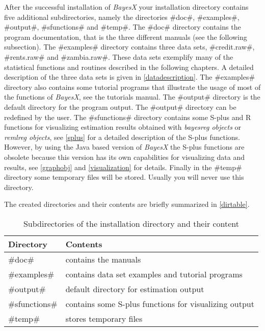 After the successful installation of {\em BayesX} your
installation directory contains five additional subdirectories,
namely the directories #doc#, #examples#, #output#, #sfunctions#
and #temp#. The #doc# directory contains the program
documentation, that is the three different manuals (see the
following subsection). The #examples# directory contains three
data sets, #credit.raw#, #rents.raw# and #zambia.raw#. These data
sets exemplify many of the statistical functions and routines
described in the following chapters. A detailed description of the
three data sets is given in \autoref{datadescription}. The
#examples# directory also contains some tutorial programs that
illustrate the usage of most of the functions of {\em BayesX}, see
the tutorials manual. The #output# directory is the default
directory for the program output. The #output# directory can be
redefined by the user. The #sfunctions# directory contains some
S-plus and R functions for visualizing estimation results obtained
with {\em bayesreg objects} or {\em remlreg objects}, see
\autoref{splus} for a detailed description of the S-plus
functions. However, by using the Java based version of {\em
BayesX} the S-plus functions are obsolete because this version has
its own capabilities for visualizing data and results, see
\autoref{graphobj} and \autoref{visualization} for details.
Finally in the #temp# directory some temporary files will be
stored. Usually you will never use this directory.

The created directories and their contents are briefly summarized
in \autoref{dirtable}.

\begin{table}[ht]
\begin{center}
\begin{tabular}{|l|l|}
\hline
Directory & Contents \\
\hline
#doc# & contains the manuals \\
#examples# & contains data set examples and tutorial programs \\
#output# & default directory for estimation output \\
#sfunctions# & contains some S-plus functions for visualizing output \\
#temp# & stores temporary files \\
\hline
\end{tabular}
{\em\caption{ \label{dirtable} Subdirectories of the installation
directory and their content}}
\end{center}
\end{table}

